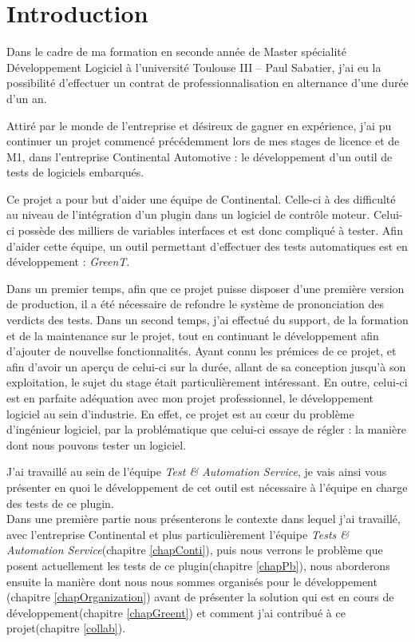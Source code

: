 \chapter*{Introduction}
Dans le cadre de ma formation en seconde année de Master spécialité Développement Logiciel à l'université Toulouse III – Paul Sabatier, j'ai eu la possibilité d'effectuer un contrat de professionnalisation en alternance d'une durée d'un an.

Attiré par le monde de l'entreprise et désireux de gagner en expérience, j'ai pu continuer un projet commencé précédemment lors de mes stages de licence et de M1, dans l'entreprise Continental Automotive : le développement d'un outil de tests de logiciels embarqués.

Ce projet a pour but d'aider une équipe de Continental. Celle-ci à des difficulté au niveau de l'intégration d'un plugin dans un logiciel de contrôle moteur. Celui-ci possède des milliers de variables interfaces et est donc compliqué à tester. Afin d'aider cette équipe, un outil permettant d'effectuer des tests automatiques est en développement : \textit{GreenT}.

Dans un premier temps, afin que ce projet puisse disposer d'une première version de production, il a été nécessaire de refondre le système de prononciation des verdicts des tests.\newline
Dans un second temps, j'ai effectué du support, de la formation et de la maintenance sur le projet, tout en continuant le développement afin d'ajouter de nouvellse fonctionnalités.\newline
Ayant connu les prémices de ce projet, et afin d'avoir un aperçu de celui-ci sur la durée, allant de sa conception jusqu'à son exploitation, le sujet du stage était particulièrement intéressant. En outre, celui-ci est en parfaite adéquation avec mon projet professionnel, le développement logiciel au sein d'industrie. En effet, ce projet est au cœur du problème d'ingénieur logiciel, par la problématique que celui-ci essaye de régler :  la manière dont nous pouvons tester un logiciel. 


J'ai travaillé au sein de l'équipe \textit{Test \& Automation Service}, je vais ainsi vous présenter en quoi le développement de cet outil est nécessaire à l'équipe en charge des tests de ce plugin.\\ Dans une première partie nous présenterons le contexte dans lequel j'ai travaillé, avec l'entreprise Continental et plus particulièrement l'équipe \textit{Tests \& Automation Service}(chapitre \ref{chapConti}), puis nous verrons le problème que posent actuellement les tests de ce plugin(chapitre \ref{chapPb}), nous aborderons ensuite la manière dont nous nous sommes organisés pour le développement (chapitre \ref{chapOrganization}) avant de présenter la solution qui est en cours de développement(chapitre \ref{chapGreent}) et comment j'ai contribué à ce projet(chapitre \ref{collab}). 
